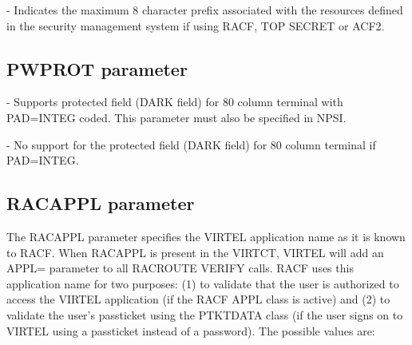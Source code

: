 \documentclass[letterpaper,10pt,english]{sphinxmanual}
\begin{document}
 - Indicates the maximum 8 character prefix associated with the resources defined in the security management system if using RACF, TOP SECRET or ACF2.


\subsection{PWPROT parameter}
\label{\detokenize{Installation_Guide:index-102}}\label{\detokenize{Installation_Guide:pwprot-parameter}}
\begin{sphinxVerbatim}[commandchars=\\\{\}]
 
\end{sphinxVerbatim}

 - Supports protected field (DARK field) for 80 column terminal with PAD=INTEG coded. This parameter must also be specified in NPSI.

 - No support for the protected field (DARK field) for 80 column terminal if PAD=INTEG.


\subsection{RACAPPL parameter}
\label{\detokenize{Installation_Guide:index-103}}\label{\detokenize{Installation_Guide:racappl-parameter}}
\begin{sphinxVerbatim}[commandchars=\\\{\}]
 
\end{sphinxVerbatim}

The RACAPPL parameter specifies the VIRTEL application name as it is known to RACF. When RACAPPL is present in the VIRTCT, VIRTEL will add an APPL= parameter to all RACROUTE VERIFY calls. RACF uses this application name for two purposes: (1) to validate that the user is authorized to access the VIRTEL application (if the RACF APPL class is active) and (2) to validate the user’s passticket using the PTKTDATA class (if the user signs on to VIRTEL using a passticket instead of a password). The possible values are:
\end{document}
